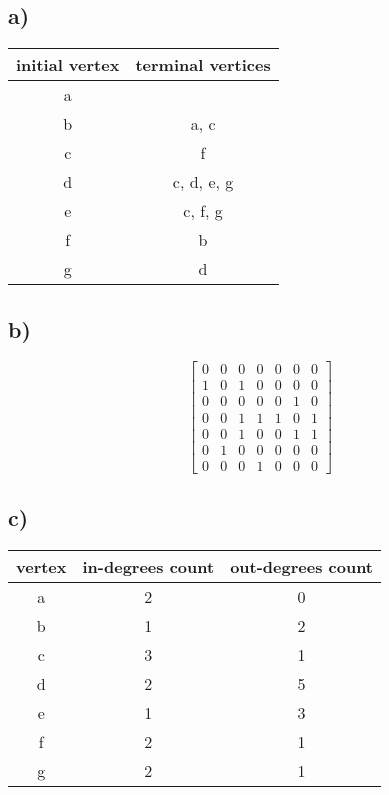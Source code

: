 \documentclass[11pt]{article}
\begin{document}
\subsection*{a)}
    \begin{table}[H]
        \centering
        \begin{tabular}{c|c}
             initial vertex & terminal vertices \\
             \hline
             a & \\
             b & a, c \\
             c & f \\
             d & c, d, e, g \\
             e & c, f, g \\
             f & b \\
             g & d
        \end{tabular}
    \end{table}{}

\subsection*{b)}
    \begin{figure}[H]
    $$  
        \begin{bmatrix}{}
            0 & 0 & 0 & 0 & 0 & 0 & 0 \\
            1 & 0 & 1 & 0 & 0 & 0 & 0 \\
            0 & 0 & 0 & 0 & 0 & 1 & 0 \\
            0 & 0 & 1 & 1 & 1 & 0 & 1 \\
            0 & 0 & 1 & 0 & 0 & 1 & 1 \\
            0 & 1 & 0 & 0 & 0 & 0 & 0 \\
            0 & 0 & 0 & 1 & 0 & 0 & 0
        \end{bmatrix}{} 
    $$
    \end{figure}{}

\subsection*{c)}
    \begin{table}[H]
        \centering
        \begin{tabular}{c|c|c}
             vertex & in-degrees count & out-degrees count \\
             \hline
             a & 2 & 0 \\
             b & 1 & 2 \\
             c & 3 & 1 \\
             d & 2 & 5 \\
             e & 1 & 3 \\
             f & 2 & 1 \\
             g & 2 & 1
        \end{tabular}
    \end{table}{}
\end{document}
